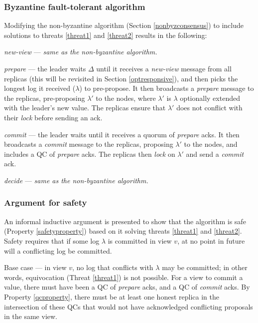\subsubsection{Byzantine fault-tolerant algorithm}
Modifying the non-byzantine algorithm (Section \ref{nonbyzconsensus}) to include solutions to threats \ref{threat1} and \ref{threat2} results in the following:

\begin{description}
	\item \textit{new-view} --- \textit{same as the non-byzantine algorithm.}
	\item \textit{prepare} --- the leader waits $\Delta$ until it receives a \textit{new-view} message from all replicas (this will be revisited in Section \ref{optresponsive}), and then picks the longest log it received ($\lambda$) to pre-propose. It then broadcasts a \textit{prepare} message to the replicas, pre-proposing $\lambda'$ to the nodes, where $\lambda'$ is $\lambda$ optionally extended with the leader's new value. The replicas ensure that $\lambda'$ does not conflict with their \textit{lock} before sending an ack.
	\item \textit{commit} --- the leader waits until it receives a quorum of \textit{prepare} acks. It then broadcasts a \textit{commit} message to the replicas, proposing $\lambda'$ to the nodes, and includes a QC of \textit{prepare} acks. The replicas then \textit{lock} on $\lambda'$ and send a \textit{commit} ack.
	\item \textit{decide} --- \textit{same as the non-byzantine algorithm.}
\end{description}

\subsubsection{Argument for safety} \label{safetyargument}
An informal inductive argument is presented to show that the algorithm is safe (Property \ref{safetyproperty}) based on it solving threats \ref{threat1} and \ref{threat2}. Safety requires that if some log $\lambda$ is committed in view $v$, at no point in future will a conflicting log be committed.

Base case --- in view $v$, no log that conflicts with $\lambda$ may be committed; in other words, equivocation (Threat \ref{threat1}) is not possible. For a view to commit a value, there must have been a QC of \textit{prepare} acks, and a QC of \textit{commit} acks. By Property \ref{qcproperty}, there must be at least one honest replica in the intersection of these QCs that would not have acknowledged conflicting proposals in the same view.

